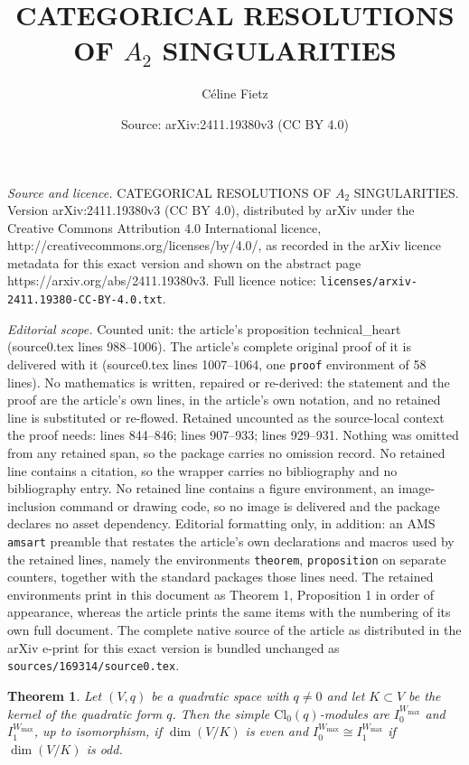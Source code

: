 \documentclass[10pt,a4paper]{amsart}
\title{\MakeUppercase{Categorical resolutions of $A_2$ singularities}}
\author{C\'eline Fietz}
\date{Source: arXiv:2411.19380v3 (CC BY 4.0)}
\newtheorem{theorem}{Theorem}
\newcommand{\evencl}{\mathrm{Cl}_0}
\newcommand{\wmax}{W_{\text{max}}}
\begin{document}
\maketitle

\noindent\emph{Source and licence.} \MakeUppercase{Categorical resolutions of $A_2$ singularities}. Version arXiv:2411.19380v3 (CC BY 4.0), distributed by arXiv under the Creative Commons Attribution 4.0 International licence, http://creativecommons.org/licenses/by/4.0/, as recorded in the arXiv licence metadata for this exact version and shown on the abstract page https://arxiv.org/abs/2411.19380v3. Full licence notice: \texttt{licenses/arxiv-2411.19380-CC-BY-4.0.txt}.\par\smallskip

\noindent\textit{Editorial scope.} Counted unit: the article's proposition technical\_heart (source0.tex lines 988--1006). The article's complete original proof of it is delivered with it (source0.tex lines 1007--1064, one \texttt{proof} environment of 58 lines). No mathematics is written, repaired or re-derived: the statement and the proof are the article's own lines, in the article's own notation, and no retained line is substituted or re-flowed.  Retained uncounted as the source-local context the proof needs: lines 844--846; lines 907--933; lines 929--931.  Nothing was omitted from any retained span, so the package carries no omission record.  No retained line contains a citation, so the wrapper carries no bibliography and no bibliography entry.  No retained line contains a figure environment, an image-inclusion command or drawing code, so no image is delivered and the package declares no asset dependency.  Editorial formatting only, in addition: an AMS \texttt{amsart} preamble that restates the article's own declarations and macros used by the retained lines, namely the environments \texttt{theorem}, \texttt{proposition} on separate counters, together with the standard packages those lines need.  The retained environments print in this document as Theorem 1, Proposition 1 in order of appearance, whereas the article prints the same items with the numbering of its own full document.  The complete native source of the article as distributed in the arXiv e-print for this exact version is bundled unchanged as \texttt{sources/169314/source0.tex}.
\begin{theorem}\label{simples_degenerate}
    Let $(V,q)$ be a quadratic space with $q\neq 0$ and let $K \subset V$ be the kernel of the quadratic form $q$. Then the simple $\evencl(q)$-modules are $I_0^{\wmax}$ and $ I_1^{\wmax}$, up to isomorphism, if $\dim(V/K)$ is even and $I_0^{\wmax} \cong I_1^{\wmax}$ if $\dim(V/K)$ is odd. 
\end{theorem}
\end{document}
